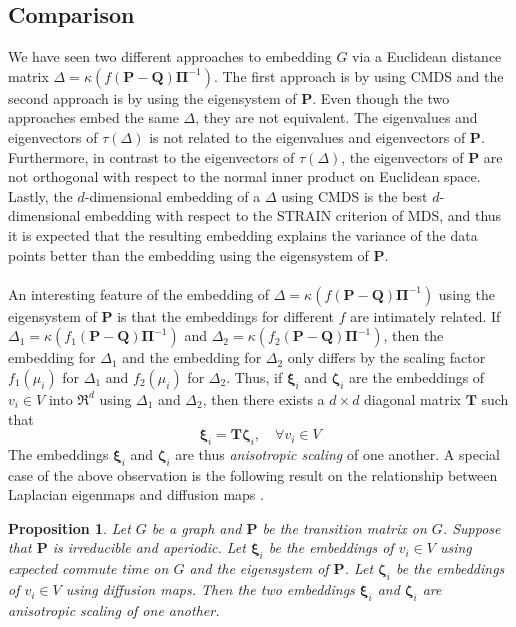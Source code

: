 \documentclass[10pt,twocolumn]{article}
\newtheorem{proposition}[theorem]{Proposition}
\numberwithin{equation}{section}
\begin{document}
\subsection{Comparison}
\label{sec:comparing-embeddings}
\noindent
We have seen two different approaches to embedding $G$ via a Euclidean
distance matrix $\Delta = \kappa(f(\mathbf{P} -
\mathbf{Q})\bm{\Pi}^{-1})$. The first approach is by using 
CMDS and the second approach is by using the eigensystem of
$\mathbf{P}$.  Even though the two approaches embed the same $\Delta$,
they are not equivalent. The eigenvalues and eigenvectors of
$\tau(\Delta)$ is not related to the eigenvalues and eigenvectors of
$\mathbf{P}$. Furthermore, in contrast to the eigenvectors of
$\tau(\Delta)$, the eigenvectors of $\mathbf{P}$ are not orthogonal
with respect to the normal inner product on Euclidean space. Lastly,
the $d$-dimensional embedding of a $\Delta$ using CMDS is the
best $d$-dimensional embedding with respect to the STRAIN criterion of
MDS, and thus it is expected that the resulting embedding explains the
variance of the data points better than the embedding using the
eigensystem of $\mathbf{P}$. \\ \\
\noindent
An interesting feature of the embedding of $\Delta =
\kappa(f(\mathbf{P} - \mathbf{Q})\bm{\Pi}^{-1}) $ using the
eigensystem of $\mathbf{P}$ is that the embeddings for different $f$
are intimately related. If $\Delta_1 = \kappa(f_1(\mathbf{P} -
\mathbf{Q})\bm{\Pi}^{-1})$ and $\Delta_2 = \kappa(f_2(\mathbf{P} -
\mathbf{Q})\bm{\Pi}^{-1})$, then the embedding for $\Delta_1$ and the
embedding for $\Delta_2$ only differs by the scaling factor
$f_1(\mu_i)$ for $\Delta_1$ and $f_2(\mu_i)$ for $\Delta_2$. Thus, if
$\bm{\xi}_i$ and $\bm{\zeta}_i$ are the embeddings of $v_i \in V$ into
$\Re^{d}$ using $\Delta_1$ and $\Delta_2$, then there exists a
$d \times d$ diagonal matrix $\mathbf{T}$ such that
\begin{equation}
  \label{eq:23}
  \bm{\xi}_i = \mathbf{T} \bm{\zeta}_i, \quad \forall v_i \in V
\end{equation}
The embeddings $\bm{\xi}_i$ and $\bm{\zeta}_i$ are thus {\em
  anisotropic scaling} of one another. A special case of the above
observation is the following result on the relationship between
Laplacian eigenmaps \cite{belkin03:_laplac} and diffusion maps
\cite{coifman06:_diffus_maps}.
\begin{proposition}
  \label{prop:9}
  Let $G$ be a graph and $\mathbf{P}$ be the transition matrix on
  $G$. Suppose that $\mathbf{P}$ is irreducible and aperiodic. Let
  $\bm{\xi}_i$ be the embeddings of $v_i \in V$ using expected commute
  time on $G$ and the eigensystem of $\mathbf{P}$. Let $\bm{\zeta}_i$
  be the embeddings of $v_i \in V$ using diffusion maps. Then the two
  embeddings $\bm{\xi}_i$ and $\bm{\zeta}_i$ are anisotropic scaling
  of one another.
\end{proposition}
\end{document}
